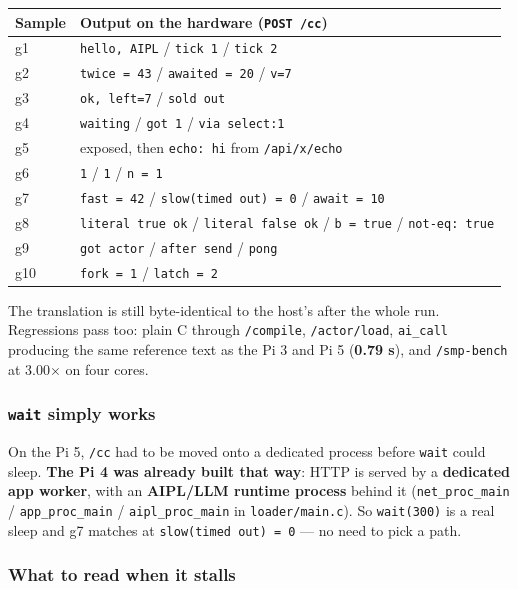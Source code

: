 \documentclass[11pt,a4paper]{article}
\begin{document}
\begin{center}
\small
\begin{tabular}{@{}ll@{}}
\toprule
Sample & Output on the hardware (\texttt{POST /cc}) \\
\midrule
g1  & \texttt{hello, AIPL} / \texttt{tick 1} / \texttt{tick 2} \\
g2  & \texttt{twice = 43} / \texttt{awaited = 20} / \texttt{v=7} \\
g3  & \texttt{ok, left=7} / \texttt{sold out} \\
g4  & \texttt{waiting} / \texttt{got 1} / \texttt{via select:1} \\
g5  & exposed, then \texttt{echo: hi} from \texttt{/api/x/echo} \\
g6  & \texttt{1} / \texttt{1} / \texttt{n = 1} \\
g7  & \texttt{fast = 42} / \texttt{slow(timed out) = 0} / \texttt{await = 10} \\
g8  & \texttt{literal true ok} / \texttt{literal false ok} / \texttt{b = true} / \texttt{not-eq: true} \\
g9  & \texttt{got actor} / \texttt{after send} / \texttt{pong} \\
g10 & \texttt{fork = 1} / \texttt{latch = 2} \\
\bottomrule
\end{tabular}
\end{center}

The translation is still byte-identical to the host's after the whole run.
Regressions pass too: plain C through \texttt{/compile}, \texttt{/actor/load},
\texttt{ai\_call} producing the same reference text as the Pi 3 and Pi 5
(\textbf{0.79 s}), and \texttt{/smp-bench} at 3.00$\times$ on four cores.

\subsubsection*{\texttt{wait} simply works}

On the Pi 5, \texttt{/cc} had to be moved onto a dedicated process before
\texttt{wait} could sleep. \textbf{The Pi 4 was already built that way}: HTTP is
served by a \textbf{dedicated app worker}, with an \textbf{AIPL/LLM runtime
process} behind it (\texttt{net\_proc\_main} / \texttt{app\_proc\_main} /
\texttt{aipl\_proc\_main} in \texttt{loader/main.c}). So \texttt{wait(300)} is a
real sleep and g7 matches at \texttt{slow(timed out) = 0} --- no need to pick a path.

\subsubsection*{What to read when it stalls}
\end{document}

